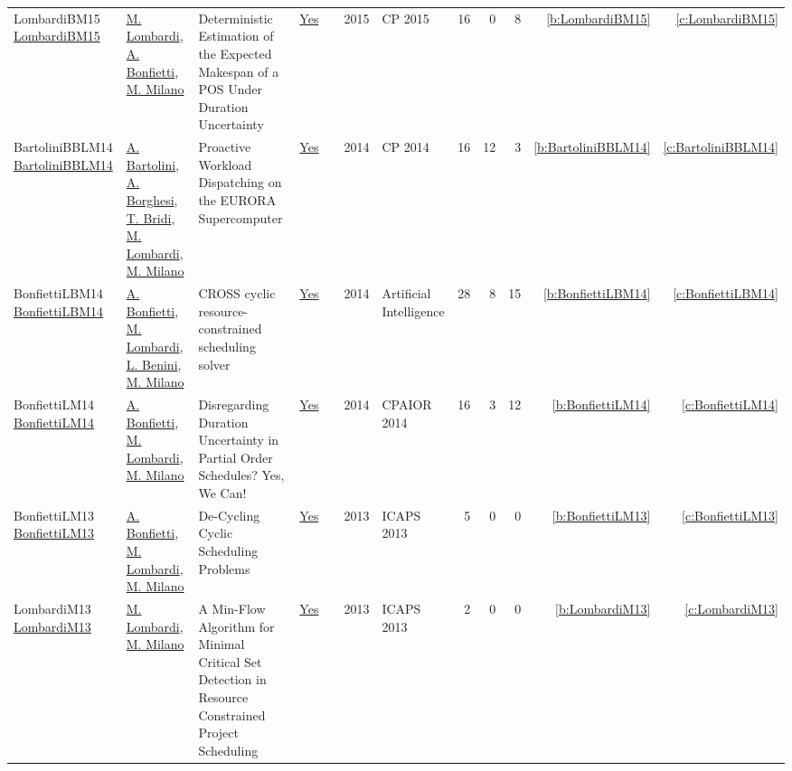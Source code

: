 {\begin{longtable}{>{\raggedright\arraybackslash}p{3cm}>{\raggedright\arraybackslash}p{6cm}>{\raggedright\arraybackslash}p{6.5cm}rrrp{2.5cm}rrrrr}
LombardiBM15 \href{https://doi.org/10.1007/978-3-319-23219-5\_20}{LombardiBM15} & \hyperref[auth:a143]{M. Lombardi}, \hyperref[auth:a204]{A. Bonfietti}, \hyperref[auth:a144]{M. Milano} & Deterministic Estimation of the Expected Makespan of a {POS} Under Duration Uncertainty & \href{works/LombardiBM15.pdf}{Yes} & \cite{LombardiBM15} & 2015 & CP 2015 & 16 & 0 & 8 & \ref{b:LombardiBM15} & \ref{c:LombardiBM15}\\
BartoliniBBLM14 \href{https://doi.org/10.1007/978-3-319-10428-7\_55}{BartoliniBBLM14} & \hyperref[auth:a231]{A. Bartolini}, \hyperref[auth:a232]{A. Borghesi}, \hyperref[auth:a233]{T. Bridi}, \hyperref[auth:a143]{M. Lombardi}, \hyperref[auth:a144]{M. Milano} & Proactive Workload Dispatching on the {EURORA} Supercomputer & \href{works/BartoliniBBLM14.pdf}{Yes} & \cite{BartoliniBBLM14} & 2014 & CP 2014 & 16 & 12 & 3 & \ref{b:BartoliniBBLM14} & \ref{c:BartoliniBBLM14}\\
BonfiettiLBM14 \href{https://doi.org/10.1016/j.artint.2013.09.006}{BonfiettiLBM14} & \hyperref[auth:a204]{A. Bonfietti}, \hyperref[auth:a143]{M. Lombardi}, \hyperref[auth:a248]{L. Benini}, \hyperref[auth:a144]{M. Milano} & {CROSS} cyclic resource-constrained scheduling solver & \href{works/BonfiettiLBM14.pdf}{Yes} & \cite{BonfiettiLBM14} & 2014 & Artificial Intelligence & 28 & 8 & 15 & \ref{b:BonfiettiLBM14} & \ref{c:BonfiettiLBM14}\\
BonfiettiLM14 \href{https://doi.org/10.1007/978-3-319-07046-9\_15}{BonfiettiLM14} & \hyperref[auth:a204]{A. Bonfietti}, \hyperref[auth:a143]{M. Lombardi}, \hyperref[auth:a144]{M. Milano} & Disregarding Duration Uncertainty in Partial Order Schedules? Yes, We Can! & \href{works/BonfiettiLM14.pdf}{Yes} & \cite{BonfiettiLM14} & 2014 & CPAIOR 2014 & 16 & 3 & 12 & \ref{b:BonfiettiLM14} & \ref{c:BonfiettiLM14}\\
BonfiettiLM13 \href{http://www.aaai.org/ocs/index.php/ICAPS/ICAPS13/paper/view/6050}{BonfiettiLM13} & \hyperref[auth:a204]{A. Bonfietti}, \hyperref[auth:a143]{M. Lombardi}, \hyperref[auth:a144]{M. Milano} & De-Cycling Cyclic Scheduling Problems & \href{works/BonfiettiLM13.pdf}{Yes} & \cite{BonfiettiLM13} & 2013 & ICAPS 2013 & 5 & 0 & 0 & \ref{b:BonfiettiLM13} & \ref{c:BonfiettiLM13}\\
LombardiM13 \href{http://www.aaai.org/ocs/index.php/ICAPS/ICAPS13/paper/view/6052}{LombardiM13} & \hyperref[auth:a143]{M. Lombardi}, \hyperref[auth:a144]{M. Milano} & A Min-Flow Algorithm for Minimal Critical Set Detection in Resource Constrained Project Scheduling & \href{works/LombardiM13.pdf}{Yes} & \cite{LombardiM13} & 2013 & ICAPS 2013 & 2 & 0 & 0 & \ref{b:LombardiM13} & \ref{c:LombardiM13}\\

\end{longtable}}
